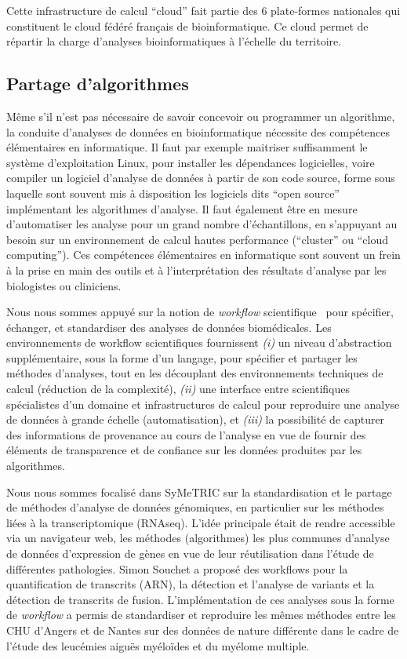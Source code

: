 \documentclass[a4paper,10pt]{article}
\theoremstyle{definition}
\begin{document}
Cette infrastructure de calcul ``cloud'' fait partie des 6 plate-formes nationales qui constituent le cloud fédéré français de bioinformatique. Ce cloud permet de répartir la charge d'analyses bioinformatiques à l'échelle du territoire. 

\subsection{Partage d'algorithmes}\label{sec:wp2}
Même s'il n'est pas nécessaire de savoir concevoir ou programmer un algorithme, la conduite d'analyses de données en bioinformatique nécessite des compétences élémentaires en informatique. Il faut par exemple maitriser suffisamment le système d'exploitation Linux, pour installer les dépendances logicielles, voire compiler un logiciel d'analyse de données à partir de son code source, forme sous laquelle sont souvent mis à disposition les logiciels dits ``open source'' implémentant les algorithmes d'analyse. Il faut également être en mesure d'automatiser les analyse pour un grand nombre d'échantillons, en s'appuyant au besoin sur un environnement de calcul hautes performance (``cluster'' ou ``cloud computing''). Ces compétences élémentaires en informatique sont souvent un frein à la prise en main des outils et à l'interprétation des résultats d'analyse par les biologistes ou cliniciens. 

Nous nous sommes appuyé sur la notion de {\em workflow} scientifique~\cite{fgcs-workflows-17} pour spécifier, échanger, et standardiser des analyses de données biomédicales. Les environnements de workflow scientifiques fournissent {\em (i)} un niveau d'abstraction sup\-plé\-men\-taire, sous la forme d'un langage, pour spécifier et partager les méthodes d'analyses, tout en les découplant des environnements techniques de calcul (réduction de la complexité), {\em (ii)} une interface entre scientifiques spécialistes d'un domaine et infrastructures de calcul pour reproduire une analyse de données à grande échelle (automatisation), et {\em (iii)} la possibilité de capturer des informations de provenance au cours de l'analyse en vue de fournir des éléments de transparence et de confiance sur les données produites par les algorithmes. 

Nous nous sommes focalisé dans SyMeTRIC sur la standardisation et le partage de méthodes d'analyse de données génomiques, en particulier sur les méthodes liées à la transcriptomique (RNAseq). L'idée principale était de rendre accessible via un navigateur web, les méthodes (algorithmes) les plus communes d’analyse de données d’expression de gènes en vue de leur réutilisation dans l'étude de différentes pathologies. Simon Souchet a proposé des workflows pour la quantification de transcrits (ARN), la détection et l'analyse de variants et la détection de transcrits de fusion. L'implémentation de ces analyses sous la forme de {\em workflow} a permis de standardiser et reproduire les mêmes méthodes entre les CHU d'Angers et de Nantes sur des données de nature différente dans le cadre de l'étude des leucémies aiguës myéloïdes et du myélome multiple.  
\end{document}
